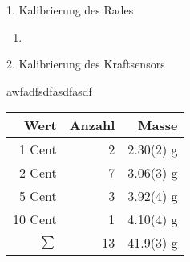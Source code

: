 \documentclass{alex_gp}
\begin{document}
\renewcommand{\labelenumi}{\alph{enumi})}

\begin{mybox}{1. Kalibrierung des Rades}
	\centering \(  \)
	\tcblower
	\begin{enumerate}
		\item 
	\end{enumerate}
\end{mybox}

\begin{mybox}{2. Kalibrierung des Kraftsensors}
	\centering \(  \)
	\tcblower
	\begin{multicols}{2}
		awfadfsdfasdfasdf
		\columnbreak
		\begin{tabular}{@{} rrr @{}}\toprule
			Wert & Anzahl & Masse \\ \midrule
			1 Cent & 2 & 2.30(2) g \\
			2 Cent & 7 & 3.06(3) g \\
			5 Cent & 3 & 3.92(4) g \\
			10 Cent & 1 & 4.10(4) g \\
			\midrule
			\( \sum \) & 13 & 41.9(3) g \\
			\bottomrule
		\end{tabular}
		\label{table:1}
	\end{multicols}
\end{mybox}
\end{document}
